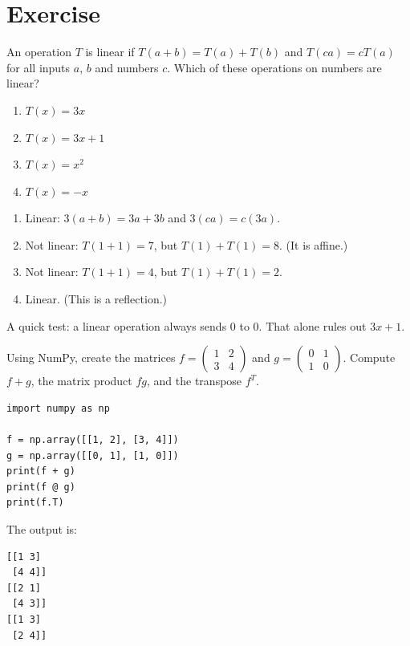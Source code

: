 \section{Exercise}

\begin{Exercise}[title={Linear or Not?}, label=la_linear]
An operation $T$ is linear if $T(a + b) = T(a) + T(b)$ and $T(ca) = cT(a)$
for all inputs $a$, $b$ and numbers $c$. Which of these operations on numbers
are linear?
\begin{enumerate}
\item $T(x) = 3x$
\item $T(x) = 3x + 1$
\item $T(x) = x^2$
\item $T(x) = -x$
\end{enumerate}
\end{Exercise}
\begin{Answer}[ref=la_linear]
\begin{enumerate}
\item Linear: $3(a + b) = 3a + 3b$ and $3(ca) = c(3a)$.
\item Not linear: $T(1 + 1) = 7$, but $T(1) + T(1) = 8$. (It is affine.)
\item Not linear: $T(1 + 1) = 4$, but $T(1) + T(1) = 2$.
\item Linear. (This is a reflection.)
\end{enumerate}
A quick test: a linear operation always sends 0 to 0. That alone rules out
$3x + 1$.
\end{Answer}

\begin{Exercise}[title={Matrix Operations in Python}, label=la_matrices]
Using NumPy, create the matrices $f = \begin{pmatrix} 1 & 2 \\ 3 & 4 \end{pmatrix}$ and $g = \begin{pmatrix} 0 & 1 \\ 1 & 0 \end{pmatrix}$. Compute $f + g$, the matrix product $f g$, and the transpose $f^T$.
\end{Exercise}
\begin{Answer}[ref=la_matrices]
\begin{verbatim}
import numpy as np

f = np.array([[1, 2], [3, 4]])
g = np.array([[0, 1], [1, 0]])
print(f + g)
print(f @ g)
print(f.T)
\end{verbatim}
The output is:
\begin{verbatim}
[[1 3]
 [4 4]]
[[2 1]
 [4 3]]
[[1 3]
 [2 4]]
\end{verbatim}
\end{Answer}
